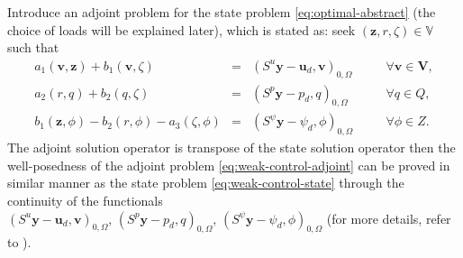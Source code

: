 \documentclass[smallextended]{svjour3}
\numberwithin{equation}{section}
\numberwithin{figure}{section}
\numberwithin{table}{section}
\newcommand\bV{\mathbf{V}}
\newcommand\by{\boldsymbol{y}}
\newcommand\bu{\boldsymbol{u}}
\newcommand\bv{\boldsymbol{v}}
\newcommand\bz{\boldsymbol{z}}
\newcommand{\bbV}{\mathbb{V}}
\begin{document}
Introduce an adjoint problem for the state problem \eqref{eq:optimal-abstract} (the choice of loads will be explained later), which is stated as: seek $(\bz, r, \zeta) \in \bbV$ such that
		\begin{subequations} \label{eq:weak-control-adjoint}
			\begin{alignat}{3}
				a_1(\bv, \bz)   +  b_1(\bv, \zeta)     &=& (S^u \by - \bu_d, \bv)_{0, \Omega}  &\quad&\forall \bv \in \bV,\\
				  a_2(r,q)   +    b_2(q,\zeta)  &=&( S^p \by - p_d, q)_{0, \Omega} &\quad&\forall q \in Q,  \\
				b_1(\bz, \phi)    -  b_2(r,\phi)- a_3(\zeta, \phi)  &=& (S^\psi \by- \psi_d, \phi)_{0, \Omega}   &\quad&\forall \phi \in Z.
		\end{alignat}\end{subequations}
    The adjoint solution operator is transpose of the state solution operator then the well-posedness of the adjoint problem \eqref{eq:weak-control-adjoint} can be proved in similar manner as the state problem \eqref{eq:weak-control-state} through the continuity of the functionals $(S^u \by - \bu_d, \bv)_{0, \Omega} , \, ( S^p \by - p_d, q)_{0, \Omega},\, (S^\psi \by- \psi_d, \phi)_{0, \Omega}$ (for more details, refer to \cite{or_sinum16,bociu22}).
\end{document}
